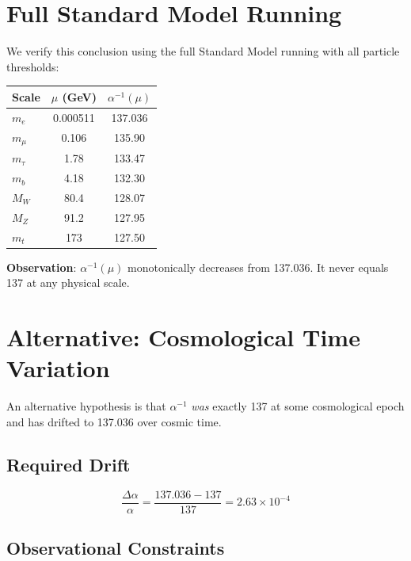 \documentclass[11pt,a4paper]{article}
\begin{document}
\section{Full Standard Model Running}

We verify this conclusion using the full Standard Model running with all particle thresholds:

\begin{center}
\begin{tabular}{|l|c|c|}
\hline
Scale & $\mu$ (GeV) & $\alpha^{-1}(\mu)$ \\
\hline
$m_e$ & 0.000511 & 137.036 \\
$m_\mu$ & 0.106 & 135.90 \\
$m_\tau$ & 1.78 & 133.47 \\
$m_b$ & 4.18 & 132.30 \\
$M_W$ & 80.4 & 128.07 \\
$M_Z$ & 91.2 & 127.95 \\
$m_t$ & 173 & 127.50 \\
\hline
\end{tabular}
\end{center}

\textbf{Observation}: $\alpha^{-1}(\mu)$ monotonically decreases from 137.036. It never equals 137 at any physical scale.

\section{Alternative: Cosmological Time Variation}

An alternative hypothesis is that $\alpha^{-1}$ \textit{was} exactly 137 at some cosmological epoch and has drifted to 137.036 over cosmic time.

\subsection{Required Drift}

\begin{equation}
\frac{\Delta\alpha}{\alpha} = \frac{137.036 - 137}{137} = 2.63 \times 10^{-4}
\end{equation}

\subsection{Observational Constraints}
\end{document}
